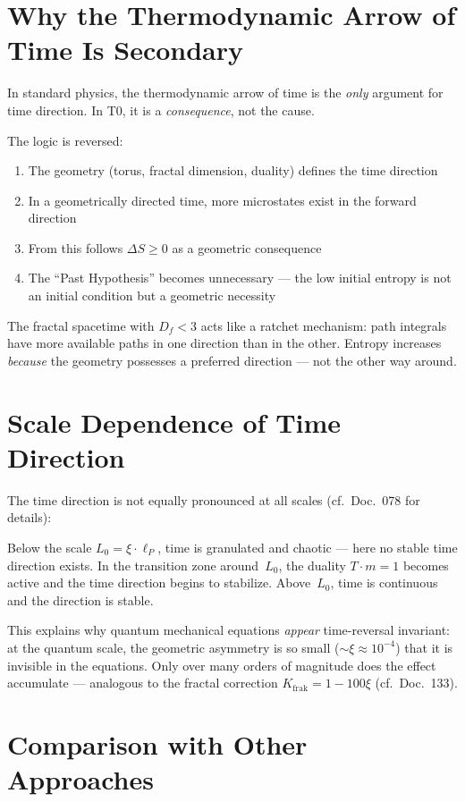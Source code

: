 \section{Why the Thermodynamic Arrow of Time Is Secondary}

In standard physics, the thermodynamic arrow of time is the \emph{only} argument for time direction. In T0, it is a \emph{consequence}, not the cause.

The logic is reversed:
\begin{enumerate}
	\item The geometry (torus, fractal dimension, duality) defines the time direction
	\item In a geometrically directed time, more microstates exist in the forward direction
	\item From this follows $\Delta S \geq 0$ as a geometric consequence
	\item The ``Past Hypothesis'' becomes unnecessary --- the low initial entropy is not an initial condition but a geometric necessity
\end{enumerate}

The fractal spacetime with $D_f < 3$ acts like a ratchet mechanism: path integrals have more available paths in one direction than in the other. Entropy increases \emph{because} the geometry possesses a preferred direction --- not the other way around.

\section{Scale Dependence of Time Direction}

The time direction is not equally pronounced at all scales (cf.\ Doc.~078 for details):

Below the scale $L_0 = \xi \cdot \ell_P$, time is granulated and chaotic --- here no stable time direction exists. In the transition zone around~$L_0$, the duality $T \cdot m = 1$ becomes active and the time direction begins to stabilize. Above~$L_0$, time is continuous and the direction is stable.

This explains why quantum mechanical equations \emph{appear} time-reversal invariant: at the quantum scale, the geometric asymmetry is so small ($\sim \xi \approx 10^{-4}$) that it is invisible in the equations. Only over many orders of magnitude does the effect accumulate --- analogous to the fractal correction $K_{\text{frak}} = 1 - 100\xi$ (cf.\ Doc.~133).

\section{Comparison with Other Approaches}

